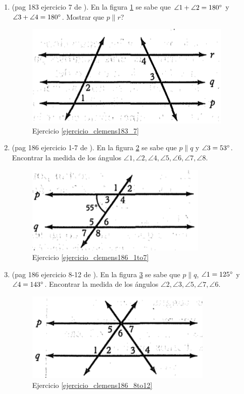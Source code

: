 \begin{enumerate}
	\item  \label{ejercicio_clemens183_7} (pag 183 ejercicio 7 de \cite{clemens}). En la figura \ref{clemens183_7} se sabe que $\angle 1 + \angle 2 =180\degree$ y $\angle 3 +\angle 4 =180\degree $. Mostrar que $p\parallel r$?
	\begin{figure}[H]
		\centering
		\includegraphics[width=0.5\linewidth]{Geometria/imgs/clemens183_7}
		\caption{Ejercicio \ref{ejercicio_clemens183_7}}
		\label{clemens183_7}
	\end{figure}
	
	\item  \label{ejercicio_clemens186_1to7} (pag 186 ejercicio 1-7 de \cite{clemens}). En la figura \ref{clemens186_1to7} se sabe que $p\parallel q$ y  $\angle 3 = 53\degree$. Encontrar la medida de los ángulos $\angle 1, \angle 2, \angle 4, \angle 5, \angle 6, \angle 7, \angle 8$.
	\begin{figure}[H]
		\centering
		\includegraphics[width=0.5\linewidth]{Geometria/imgs/clemens186_1to7}
		\caption{Ejercicio \ref{ejercicio_clemens186_1to7}}
		\label{clemens186_1to7}
	\end{figure}
	
	\item  \label{ejercicio_clemens186_8to12} (pag 186 ejercicio 8-12 de \cite{clemens}). En la figura \ref{clemens186_8to12} se sabe que $p\parallel q$, $\angle 1 = 125\degree$ y $\angle 4 = 143\degree$. Encontrar la medida de los ángulos $\angle 2, \angle 3, \angle 5, \angle 7, \angle 6$.
	\begin{figure}[H]
		\centering
		\includegraphics[width=0.5\linewidth]{Geometria/imgs/clemens186_8to12}
		\caption{Ejercicio \ref{ejercicio_clemens186_8to12}}
		\label{clemens186_8to12}
	\end{figure}
	

\end{enumerate}
